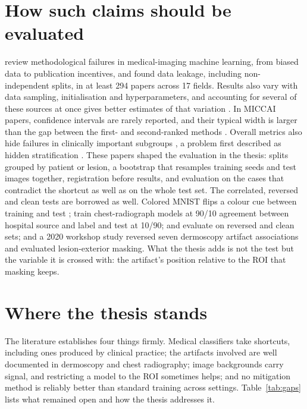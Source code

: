 \documentclass[11pt,a4paper]{article}
\begin{document}
\section{How such claims should be evaluated}
\citet{varoquaux2022failures} review methodological failures in medical-imaging machine learning, from biased data to
publication incentives, and \citet{kapoor2023leakage} found data leakage, including non-independent splits, in at least
294 papers across 17 fields. Results also vary with data sampling, initialisation and hyperparameters, and accounting
for several of these sources at once gives better estimates of that variation \citep{bouthillier2021variance}. In MICCAI
papers, confidence intervals are rarely reported, and their typical width is larger than the gap between the first- and
second-ranked methods \citep{christodoulou2024ci}. Overall metrics also hide failures in clinically important subgroups
\citep{yang2024limits}, a problem first described as hidden stratification \citep{oakden2020hidden}. These papers shaped
the evaluation in the thesis: splits grouped by patient or lesion, a bootstrap that resamples training seeds and test
images together, registration before results, and evaluation on the cases that contradict the shortcut as well as on
the whole test set. The correlated, reversed and clean tests are borrowed as well. Colored MNIST flips a
colour cue between training and test \citep{arjovsky2019irm}; \citet{puli2022nurd} train chest-radiograph models at
90/10 agreement between hospital source and label and test at 10/90; \citet{bassi2024isnet} and
\citet{corbetta2026beyond} evaluate on reversed and clean sets; and a 2020 workshop study reversed seven dermoscopy
artifact associations and evaluated lesion-exterior masking. What the thesis adds is not the test but the variable it
is crossed with: the artifact's position relative to the ROI that masking keeps.

\section{Where the thesis stands}
The literature establishes four things firmly. Medical classifiers take shortcuts, including ones produced by clinical
practice; the artifacts involved are well documented in dermoscopy and chest radiography; image backgrounds carry
signal, and restricting a model to the ROI sometimes helps; and no mitigation method is reliably better than standard
training across settings. Table~\ref{tab:gaps} lists what remained open and how the thesis addresses it.
\end{document}
